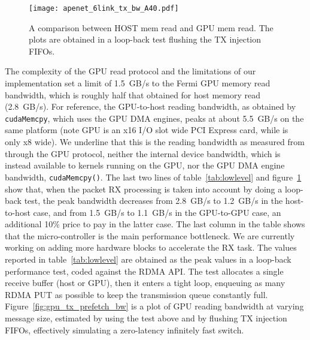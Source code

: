 \begin{figure}[!htb]
\centering
\texttt{[image: apenet\_6link\_tx\_bw\_A40.pdf]}
\caption{A comparison between HOST mem read and GPU mem read. The
plots are obtained in a loop-back test flushing the TX injection
FIFOs.}
\label{fig:apenet_tx_bw}
\end{figure}


The complexity of the GPU \PtoP read protocol and the limitations of
our implementation set a limit of 1.5~GB/s to the Fermi GPU memory
read bandwidth, which is roughly half that obtained for host memory
read (2.8~GB/s).
For reference, the GPU-to-host reading bandwidth, as obtained by
\texttt{cudaMemcpy}, which uses the GPU DMA engines, peaks at about
5.5~GB/s on the same platform (note \nvidia GPU is an x16 I/O slot wide
PCI Express card, while \apenetp is only x8 wide).
We underline that this is the reading bandwidth as measured from
\apenetp through the GPU \PtoP protocol, neither the internal device
bandwidth, which is instead available to kernels running on the GPU,
nor the GPU DMA engine bandwidth, \eg \texttt{cudaMemcpy()}.
The last two lines of table~\ref{tab:lowlevel} and
figure~\ref{fig:apenet_tx_bw} show that, when the packet RX processing
is taken into account by doing a loop-back test, the peak bandwidth
decreases from 2.8~GB/s to 1.2~GB/s in the host-to-host case, and from
1.5~GB/s to 1.1~GB/s in the GPU-to-GPU case, \ie an additional 10\%
price to pay in the latter case.
The last column in the table shows that the \nios
\mbox{micro-controller} is the main performance bottleneck.
We are currently working on adding more hardware blocks to accelerate
the RX task.
The values reported in table~\ref{tab:lowlevel} are obtained as the
peak values in a loop-back performance test, coded against the
\apenetp RDMA API.
The test allocates a single receive buffer (host or GPU), then it
enters a tight loop, enqueuing as many RDMA PUT as possible to keep
the transmission queue constantly full.
Figure~\ref{fig:gpu_tx_prefetch_bw} is a plot of GPU reading bandwidth
at varying message size, estimated by using the test above and by
flushing TX injection FIFOs, effectively simulating a zero-latency
infinitely fast switch.


